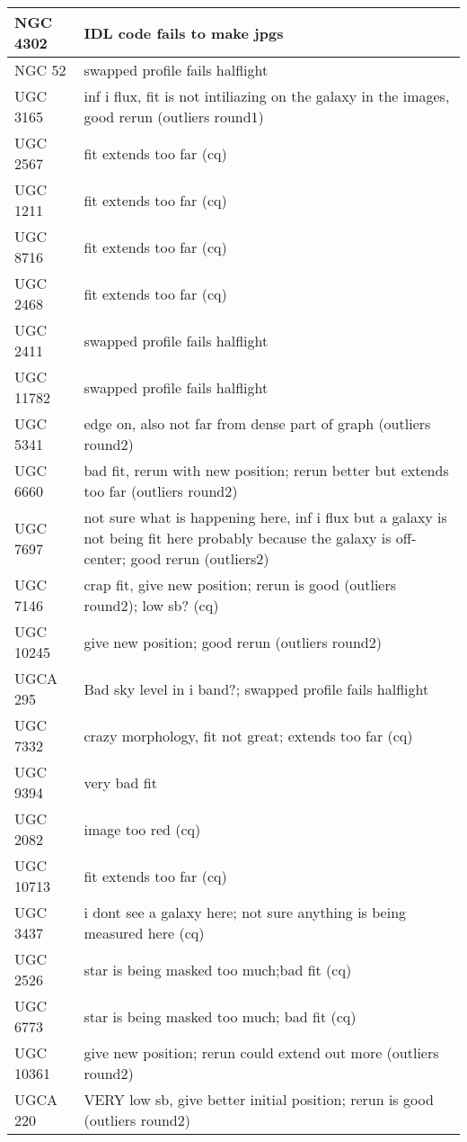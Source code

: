 \documentclass[10pt]{article}
\begin{document}
\begin{landscape}
\begin{longtable}{|l|l|}
NGC 4302 & IDL code fails to make jpgs \\ \hline
NGC 52 & swapped profile fails halflight\\ \hline
UGC 3165 & inf i flux, fit is not intiliazing on the galaxy in the images, good rerun (outliers round1)\\ \hline
UGC 2567 & fit extends too far (cq)\\ \hline
UGC 1211 & fit extends too far (cq)\\ \hline
UGC 8716 & fit extends too far (cq)\\ \hline
UGC 2468 & fit extends too far (cq)\\ \hline
UGC 2411 & swapped profile fails halflight\\ \hline
UGC 11782 & swapped profile fails halflight\\ \hline
UGC 5341 & edge on, also not far from dense part of graph (outliers round2)\\ \hline
UGC 6660 & bad fit, rerun with new position; rerun better but extends too far (outliers round2)\\ \hline
UGC 7697 & not sure what is happening here, inf i flux but a galaxy is not being fit here probably because the galaxy is off-center; good rerun (outliers2) \\ \hline
UGC 7146 & crap fit, give new position; rerun is good (outliers round2); low sb? (cq) \\ \hline 
UGC 10245 & give new position; good rerun (outliers round2)\\ \hline 
UGCA 295 & Bad sky level in i band?; swapped profile fails halflight\\ \hline 
UGC 7332 & crazy morphology, fit not great; extends too far (cq)\\ \hline 
UGC 9394 & very bad fit \\ \hline 
UGC 2082 & image too red (cq)\\ \hline 
UGC 10713 & fit extends too far (cq)\\ \hline 
UGC 3437 & i dont see a galaxy here; not sure anything is being measured here (cq)\\ \hline 
UGC 2526 & star is being masked too much;bad fit (cq)\\ \hline 
UGC 6773 & star is being masked too much; bad fit (cq)\\ \hline 
UGC 10361 & give new position; rerun could extend out more (outliers round2)\\ \hline 
UGCA 220 & VERY low sb, give better initial position; rerun is good (outliers round2)\\ \hline 

\end{longtable}
\end{landscape}
\end{document}
